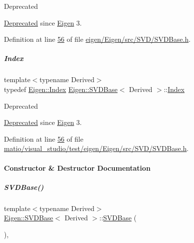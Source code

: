 \begin{DoxyRefDesc}{Deprecated}
\item[\hyperlink{deprecated__deprecated000038}{Deprecated}]since \hyperlink{namespace_eigen}{Eigen} 3. \end{DoxyRefDesc}


Definition at line \hyperlink{eigen_2_eigen_2src_2_s_v_d_2_s_v_d_base_8h_source_l00056}{56} of file \hyperlink{eigen_2_eigen_2src_2_s_v_d_2_s_v_d_base_8h_source}{eigen/\+Eigen/src/\+S\+V\+D/\+S\+V\+D\+Base.\+h}.

\mbox{\label{group___s_v_d___module_a6229a37997eca1072b52cca5ee7a2bec}} 
\subparagraph{\texorpdfstring{Index}{Index}\hspace{0.1cm}{\footnotesize\ttfamily [2/2]}}
{\footnotesize\ttfamily template$<$typename Derived$>$ \\
typedef \hyperlink{namespace_eigen_a62e77e0933482dafde8fe197d9a2cfde}{Eigen\+::\+Index} \hyperlink{group___s_v_d___module_class_eigen_1_1_s_v_d_base}{Eigen\+::\+S\+V\+D\+Base}$<$ Derived $>$\+::\hyperlink{group___s_v_d___module_a6229a37997eca1072b52cca5ee7a2bec}{Index}}

\begin{DoxyRefDesc}{Deprecated}
\item[\hyperlink{deprecated__deprecated000082}{Deprecated}]since \hyperlink{namespace_eigen}{Eigen} 3. \end{DoxyRefDesc}


Definition at line \hyperlink{matio_2visual__studio_2test_2eigen_2_eigen_2src_2_s_v_d_2_s_v_d_base_8h_source_l00056}{56} of file \hyperlink{matio_2visual__studio_2test_2eigen_2_eigen_2src_2_s_v_d_2_s_v_d_base_8h_source}{matio/visual\+\_\+studio/test/eigen/\+Eigen/src/\+S\+V\+D/\+S\+V\+D\+Base.\+h}.



\paragraph{Constructor \& Destructor Documentation}
\mbox{\label{group___s_v_d___module_abed06fc6f4b743e1f76a7b317539da87}} 
\subparagraph{\texorpdfstring{S\+V\+D\+Base()}{SVDBase()}\hspace{0.1cm}{\footnotesize\ttfamily [1/2]}}
{\footnotesize\ttfamily template$<$typename Derived$>$ \\
\hyperlink{group___s_v_d___module_class_eigen_1_1_s_v_d_base}{Eigen\+::\+S\+V\+D\+Base}$<$ Derived $>$\+::\hyperlink{group___s_v_d___module_class_eigen_1_1_s_v_d_base}{S\+V\+D\+Base} (\begin{DoxyParamCaption}{ }\end{DoxyParamCaption})\hspace{0.3cm}{\ttfamily [inline]}, {\ttfamily [protected]}}



